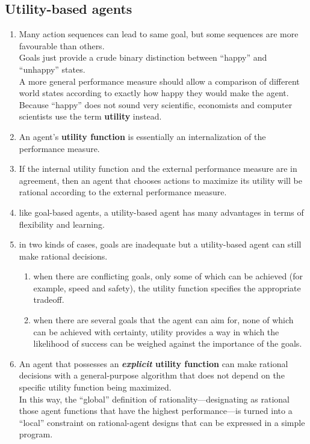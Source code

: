 \subsection{Utility-based agents \cite{aci-1}}

\begin{enumerate}
    \item Many action sequences can lead to same goal, but some sequences are more favourable than others.\\
    Goals just provide a crude binary distinction between “happy” and “unhappy” states.\\
    A more general performance measure should allow a comparison of different world states according to exactly how happy they would make the agent.\\
    Because “happy” does not sound very scientific, economists and computer scientists use the term \textbf{utility} instead.

    \item An agent’s \textbf{utility function} is essentially an internalization of the performance measure. 
    
    \item If the internal utility function and the external performance measure are in agreement, then an agent that chooses actions to maximize its utility will be rational according to the external performance measure. 

    \item like goal-based agents, a utility-based agent has many advantages in terms of flexibility and learning.

    \item in two kinds of cases, goals are inadequate but a utility-based agent can still make rational decisions. 
    \begin{enumerate}
        \item when there are conflicting goals, only some of which can be achieved (for example, speed and safety), the utility function specifies the appropriate tradeoff.

        \item when there are several goals that the agent can aim for, none of which can be achieved with certainty, utility provides a way in which the likelihood of success can be weighed against the importance of the goals. 
    \end{enumerate}

    \item An agent that possesses an \textbf{\textit{explicit} utility function} can make rational decisions with a general-purpose algorithm that does not depend on the specific utility function being maximized.\\
    In this way, the “global” definition of rationality—designating as rational those agent functions that have the highest performance—is turned into a “local” constraint on rational-agent designs that can be expressed in a simple program.


\end{enumerate}
